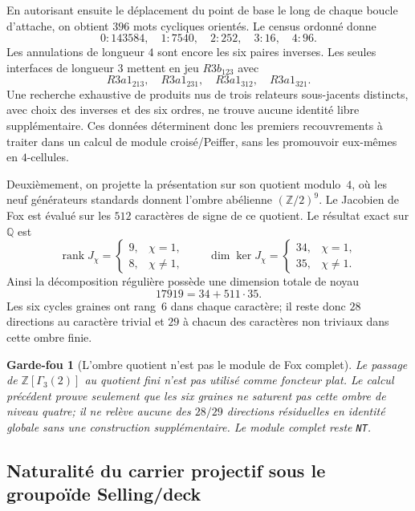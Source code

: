 \documentclass[11pt,a4paper]{article}
\newtheorem{guardrail}[theorem]{Garde-fou}
\newcommand{\rank}{\operatorname{rank}}
\newcommand{\certNT}{\texttt{NT}}
\begin{document}
En autorisant ensuite le déplacement du point de base le long de chaque boucle d'attache, on obtient $396$ mots cycliques orientés. Le census ordonné donne
\[
 \boxed{0:143584,\quad 1:7540,\quad 2:252,\quad 3:16,\quad 4:96.}
\]
Les annulations de longueur $4$ sont encore les six paires inverses. Les seules interfaces de longueur $3$ mettent en jeu $R3b_{123}$ avec
\[
 R3a1_{213},\quad R3a1_{231},\quad R3a1_{312},\quad R3a1_{321}.
\]
Une recherche exhaustive de produits nus de trois relateurs sous-jacents distincts, avec choix des inverses et des six ordres, ne trouve aucune identité libre supplémentaire. Ces données déterminent donc les premiers recouvrements à traiter dans un calcul de module croisé/Peiffer, sans les promouvoir eux-mêmes en $4$-cellules.

Deuxièmement, on projette la présentation sur son quotient modulo~$4$, où les neuf générateurs standards donnent l'ombre abélienne $(\mathbb Z/2)^9$. Le Jacobien de Fox est évalué sur les $512$ caractères de signe de ce quotient. Le résultat exact sur $\mathbb Q$ est
\[
 \rank J_\chi=
 \begin{cases}
 9,&\chi=1,\\
 8,&\chi\ne1,
 \end{cases}
 \qquad
 \dim\ker J_\chi=
 \begin{cases}
 34,&\chi=1,\\
 35,&\chi\ne1.
 \end{cases}
\]
Ainsi la décomposition régulière possède une dimension totale de noyau
\[
 \boxed{17919=34+511\cdot35}.
\]
Les six cycles graines ont rang~$6$ dans chaque caractère; il reste donc $28$ directions au caractère trivial et $29$ à chacun des caractères non triviaux dans cette ombre finie.

\begin{guardrail}[L'ombre quotient n'est pas le module de Fox complet]
Le passage de $\mathbb Z[\Gamma_3(2)]$ au quotient fini n'est pas utilisé comme foncteur plat. Le calcul précédent prouve seulement que les six graines ne saturent pas cette ombre de niveau quatre; il ne relève aucune des $28/29$ directions résiduelles en identité globale sans une construction supplémentaire. Le module complet reste \certNT{}.
\end{guardrail}

\subsection{Naturalité du carrier projectif sous le groupoïde Selling/deck}
\end{document}
